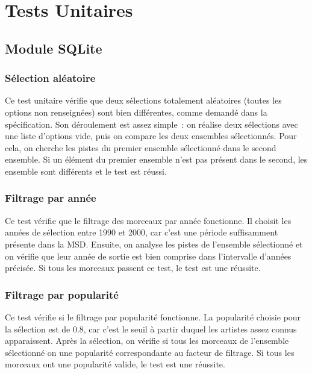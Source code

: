 \section{Tests Unitaires}
\label{tests:unitaires}

\subsection{Module SQLite}
\label{tests:unitaires:sqlite}

\subsubsection{Sélection aléatoire}
\label{tests:unitaires:sqlite:random}

Ce test unitaire vérifie que deux sélections totalement aléatoires (toutes les
options non renseignées) sont bien différentes, comme demandé dans la
spécification. Son déroulement est assez simple~: on réalise deux sélections 
avec une liste d'options vide, puis on compare les deux ensembles sélectionnés.
Pour cela, on cherche les pistes du premier ensemble sélectionné dans le second
ensemble. Si un élément du premier ensemble n'est pas présent dans le second,
les ensemble sont différents et le test est réussi.

\subsubsection{Filtrage par année}
\label{tests:unitaires:sqlite:annee}

Ce test vérifie que le filtrage des morceaux par année fonctionne. Il choisit 
les années de sélection entre 1990 et 2000, car c'est une période suffisamment
présente dans la MSD. Ensuite, on analyse les pistes de l'ensemble
sélectionné et on vérifie que leur année de sortie est bien comprise dans
l'intervalle d'années précisée. Si tous les morceaux passent ce test, le test
est une réussite.

\subsubsection{Filtrage par popularité}
\label{tests:unitaires:sqlite:popularite}

Ce test vérifie si le filtrage par popularité fonctionne. La popularité choisie 
pour la sélection est de 0.8, car c'est le seuil à partir duquel les artistes
assez connus apparaissent. Après la sélection, on vérifie si tous les morceaux
de l'ensemble sélectionné on une popularité correspondante au facteur de
filtrage. Si tous les morceaux ont une popularité valide, le test est une
réussite.

